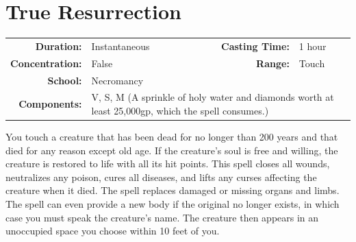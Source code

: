 \documentclass[12pt,showtrims]{memoir}
\begin{document}
\newpage
\section*{True Resurrection}

{
\small\centering\vspace{-6pt}
\begin{tabular}{rlrl}
\toprule

\textbf{Duration:} & Instantaneous &
\textbf{Casting Time:} & 1 hour \\
\textbf{Concentration:} & False &
\textbf{Range:} & Touch \\
\textbf{School:} & Necromancy \\
\textbf{Components:} & \multicolumn{3}{p{0.7\textwidth}}{V, S, M (A sprinkle of holy water and diamonds worth at least 25,000gp, which the spell consumes.)}\\

\bottomrule
\end{tabular}
}

\vspace{1\baselineskip}\noindent You touch a creature that has been dead for no longer than 200 years and that died for any reason except old age. If the creature's soul is free and willing, the creature is restored to life with all its hit points. This spell closes all wounds, neutralizes any poison, cures all diseases, and lifts any curses affecting the creature when it died. The spell replaces damaged or missing organs and limbs. The spell can even provide a new body if the original no longer exists, in which case you must speak the creature's name. The creature then appears in an unoccupied space you choose within 10 feet of you.

\newpage
\end{document}
